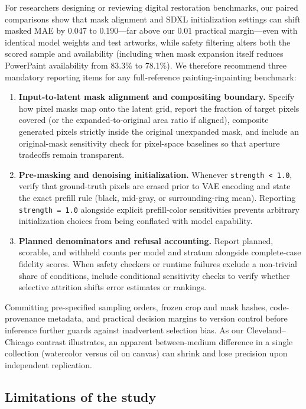 \documentclass[fleqn,12pt,lineno]{wlpeerj}
\providecommand{\tightlist}{\setlength{\itemsep}{0pt}\setlength{\parskip}{0pt}}
\begin{document}
For researchers designing or reviewing digital restoration benchmarks, our paired comparisons show that mask alignment and SDXL initialization settings can shift masked MAE by 0.047 to 0.190---far above our 0.01 practical margin---even with identical model weights and test artworks, while safety filtering alters both the scored sample and availability (including when mask expansion itself reduces PowerPaint availability from 83.3\% to 78.1\%). We therefore recommend three mandatory reporting items for any full-reference painting-inpainting benchmark:

\begin{enumerate}
\def\labelenumi{\arabic{enumi}.}
\tightlist
\item
  \textbf{Input-to-latent mask alignment and compositing boundary.} Specify how pixel masks map onto the latent grid, report the fraction of target pixels covered (or the expanded-to-original area ratio if aligned), composite generated pixels strictly inside the original unexpanded mask, and include an original-mask sensitivity check for pixel-space baselines so that aperture tradeoffs remain transparent.
\item
  \textbf{Pre-masking and denoising initialization.} Whenever \texttt{strength\ \textless{}\ 1.0}, verify that ground-truth pixels are erased prior to VAE encoding and state the exact prefill rule (black, mid-gray, or surrounding-ring mean). Reporting \texttt{strength\ =\ 1.0} alongside explicit prefill-color sensitivities prevents arbitrary initialization choices from being conflated with model capability.
\item
  \textbf{Planned denominators and refusal accounting.} Report planned, scorable, and withheld counts per model and stratum alongside complete-case fidelity scores. When safety checkers or runtime failures exclude a non-trivial share of conditions, include conditional sensitivity checks to verify whether selective attrition shifts error estimates or rankings.
\end{enumerate}

Committing pre-specified sampling orders, frozen crop and mask hashes, code-provenance metadata, and practical decision margins to version control before inference further guards against inadvertent selection bias. As our Cleveland--Chicago contrast illustrates, an apparent between-medium difference in a single collection (watercolor versus oil on canvas) can shrink and lose precision upon independent replication.

\subsection{Limitations of the study}\label{limitations-of-the-study}
\end{document}
